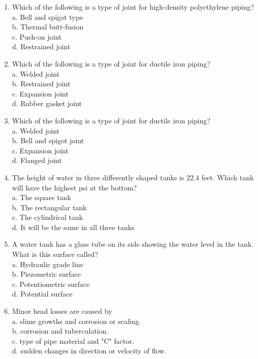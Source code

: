 \documentclass[10pt]{article}
\begin{document}
\begin{enumerate}
  \item Which of the following is a type of joint for high-density polyethylene piping?\\
a. Bell and spigot type\\
b. Thermal butt-fusion\\
c. Push-on joint\\
d. Restrained joint

  \item Which of the following is a type of joint for ductile iron piping?\\
a. Welded joint\\
b. Restrained joint\\
c. Expansion joint\\
d. Rubber gasket joint

  \item Which of the following is a type of joint for ductile iron piping?\\
a. Welded joint\\
b. Bell and spigot joint\\
c. Expansion joint\\
d. Flanged joint

  \item The height of water in three differently shaped tanks is $22.4$ feet. Which tank will have the highest psi at the bottom?\\
a. The square tank\\
b. The rectangular tank\\
c. The cylindrical tank\\
d. It will be the same in all three tanks

  \item A water tank has a glass tube on its side showing the water level in the tank. What is this surface called?\\
a. Hydraulic grade line\\
b. Piezometric surface\\
c. Potentiometric surface\\
d. Potential surface

  \item Minor head losses are caused by\\
a. slime growths and corrosion or scaling.\\
b. corrosion and tuberculation.\\
c. type of pipe material and "C" factor.\\
d. sudden changes in direction or velocity of flow.


\end{enumerate}
\end{document}
